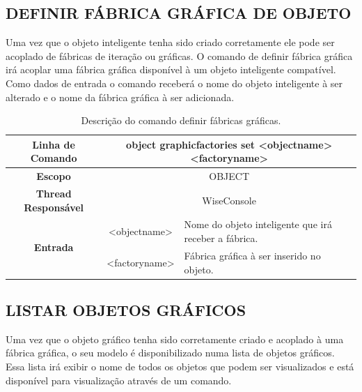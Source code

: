 \documentclass[a4paper,12pt]{monografia}
\theoremstyle{plain}
\theoremstyle{definition}
\theoremstyle{remark}
\begin{document}
\subsection{DEFINIR FÁBRICA GRÁFICA DE OBJETO}\label{sec:graphic_factories_set}

Uma vez que o objeto inteligente tenha sido criado corretamente ele pode ser acoplado de fábricas de iteração ou gráficas. O comando de definir fábrica gráfica irá acoplar uma fábrica gráfica disponível à um objeto inteligente compatível. Como dados de entrada o comando receberá o nome do objeto inteligente à ser alterado e o nome da fábrica gráfica à ser adicionada.

\begin{center}
	\begin{table}[!htbp]
		\begin{tabular}{|c|c|m{}|}
			\hline
			\textbf{Linha de Comando} & \multicolumn{2}{c|}{object graphic\underline{\space\space}factories set <object\underline{\space\space}name> <factory\underline{\space\space}name>} \\
			\hline
			\textbf{Escopo} & \multicolumn{2}{c|}{OBJECT} \\
			\hline
			\textbf{Thread Responsável} & \multicolumn{2}{c|}{WiseConsole} \\
			\hline
			\multirow{2}{*}{\textbf{Entrada}} & <object\underline{\space\space}name> & Nome do objeto inteligente que irá receber a fábrica. \\
			& <factory\underline{\space\space}name> & Fábrica gráfica à ser inserido no objeto. \\
			\hline
		\end{tabular}
		\caption{Descrição do comando definir fábricas gráficas.}
		\label{tab:graphic_factories_set}
	\end{table}
\end{center}

\subsection{LISTAR OBJETOS GRÁFICOS}\label{sec:graphic_list}

Uma vez que o objeto gráfico tenha sido corretamente criado e acoplado à uma fábrica gráfica, o seu modelo é disponibilizado numa lista de objetos gráficos. Essa lista irá exibir o nome de todos os objetos que podem ser visualizados e está disponível para visualização através de um comando.
\end{document}
